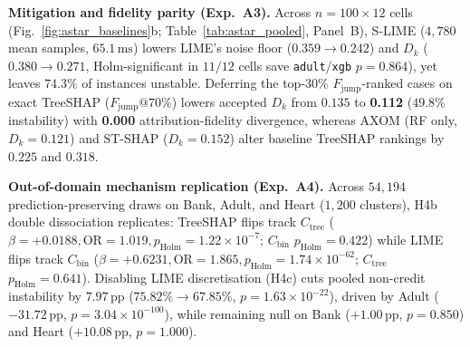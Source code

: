 \documentclass[conference]{IEEEtran}
\begin{document}
\textbf{Mitigation and fidelity parity (Exp.~A3).} Across $n{=}100\times 12$ cells (Fig.~\ref{fig:astar_baselines}b; Table~\ref{tab:astar_pooled}, Panel~B), S-LIME ($4{,}780$ mean samples, $65.1\,\text{ms}$) lowers LIME's noise floor ($0.359{\to}0.242$) and $D_k$ ($0.380{\to}0.271$, Holm-significant in $11/12$ cells save \texttt{adult}/\texttt{xgb} $p{=}0.864$), yet leaves $74.3\%$ of instances unstable. Deferring the top-$30\%$ $F_{\mathrm{jump}}$-ranked cases on exact TreeSHAP ($F_{\mathrm{jump}}@70\%$) lowers accepted $D_k$ from $0.135$ to \textbf{0.112} ($49.8\%$ instability) with \textbf{0.000} attribution-fidelity divergence, whereas AXOM (RF only, $D_k{=}0.121$) and ST-SHAP ($D_k{=}0.152$) alter baseline TreeSHAP rankings by $0.225$ and $0.318$.

\textbf{Out-of-domain mechanism replication (Exp.~A4).} Across $54{,}194$ prediction-preserving draws on Bank, Adult, and Heart ($1{,}200$ clusters), H4b double dissociation replicates: TreeSHAP flips track $C_{\mathrm{tree}}$ ($\beta{=}{+}0.0188, \mathrm{OR}{=}1.019, p_{\mathrm{Holm}}{=}1.22\times 10^{-7}$; $C_{\mathrm{bin}}$ $p_{\mathrm{Holm}}{=}0.422$) while LIME flips track $C_{\mathrm{bin}}$ ($\beta{=}{+}0.6231, \mathrm{OR}{=}1.865, p_{\mathrm{Holm}}{=}1.74\times 10^{-62}$; $C_{\mathrm{tree}}$ $p_{\mathrm{Holm}}{=}0.641$). Disabling LIME discretisation (H4c) cuts pooled non-credit instability by $7.97\,\text{pp}$ ($75.82\%{\to}67.85\%$, $p{=}1.63\times 10^{-22}$), driven by Adult ($-31.72\,\text{pp}$, $p{=}3.04\times 10^{-100}$), while remaining null on Bank ($+1.00\,\text{pp}$, $p{=}0.850$) and Heart ($+10.08\,\text{pp}$, $p{=}1.000$).
\end{document}

